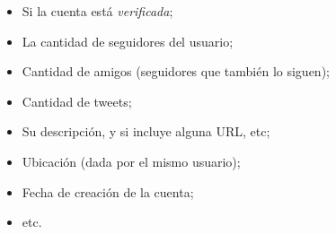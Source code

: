 \documentclass[upright, contnum]{umemoria}
\begin{document}
\begin{itemize}
\item Si la cuenta está \emph{verificada};
\item La cantidad de seguidores del usuario;
\item Cantidad de amigos (seguidores que también lo siguen);
\item Cantidad de tweets;
\item Su descripción, y si incluye alguna URL, etc;
\item Ubicación (dada por el mismo usuario);
\item Fecha de creación de la cuenta;
\item etc.
\end{itemize}
\nocite{*}


\end{document}
